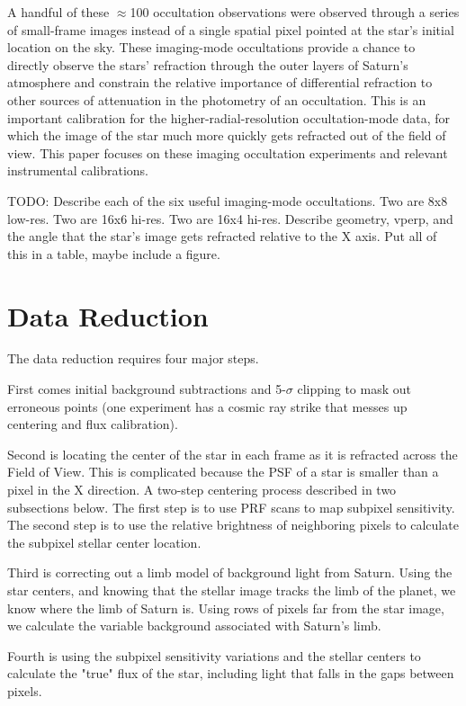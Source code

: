 \documentclass[twocolumn, twocolappendix, numberedappendix, linenumbers]{aastex631}
\begin{document}
A handful of these $\approx$100 occultation observations were observed through
a series of small-frame images instead of a single spatial pixel pointed at the
star's initial location on the sky.  These imaging-mode occultations provide a
chance to directly observe the stars' refraction through the outer layers of
Saturn's atmosphere and constrain the relative importance of differential
refraction to other sources of attenuation in the photometry of an occultation.
This is an important calibration for the higher-radial-resolution
occultation-mode data, for which the image of the star much more quickly gets
refracted out of the field of view. This paper focuses on these imaging
occultation experiments and relevant instrumental calibrations.

TODO: Describe each of the six useful imaging-mode occultations. Two are 8x8
low-res. Two are 16x6 hi-res. Two are 16x4 hi-res. Describe geometry, vperp,
and the angle that the star's image gets refracted relative to the X axis.
Put all of this in a table, maybe include a figure.

\section{Data Reduction} \label{sec:data}
The data reduction requires four major steps.

First comes initial background subtractions and 5-$\sigma$ clipping to mask out
erroneous points (one experiment has a cosmic ray strike that messes up
centering and flux calibration).

Second is locating the center of the star in each frame as it is refracted
across the Field of View. This is complicated because the PSF of a star is
smaller than a pixel in the X direction. A two-step centering process described
in two subsections below. The first step is to use PRF scans to map subpixel
sensitivity. The second step is to use the relative brightness of neighboring
pixels to calculate the subpixel stellar center location.

Third is correcting out a limb model of background light from Saturn. Using the
star centers, and knowing that the stellar image tracks the limb of the planet,
we know where the limb of Saturn is. Using rows of pixels far from the star
image, we calculate the variable background associated with Saturn's limb.

Fourth is using the subpixel sensitivity variations and the stellar centers to
calculate the "true" flux of the star, including light that falls in the gaps
between pixels.
\end{document}
